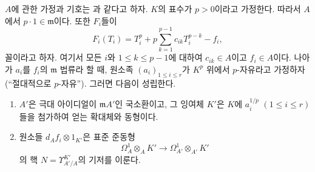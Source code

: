 \begin{proposition}[22.4.4]
\label{0.22.4.4-ko}
$A$에 관한 가정과 기호는 과 같다고 하자. $K$의
표수가 $p>0$이라고 가정한다. 따라서 $A$에서
$p\cdot1\in\mathfrak m$이다. 또한 $F_i$들이
\begin{equation}
\label{0.22.4.4.1-ko}
  F_i(T_i)=T_i^p+p\sum_{k=1}^{p-1}c_{ik}T_i^{p-k}-f_i,
  \tag{22.4.4.1}
\end{equation}
꼴이라고 하자. 여기서 모든 $i$와 $1\leqslant k\leqslant p-1$에
대하여 $c_{ik}\in A$이고 $f_i\in A$이다. 나아가 $a_i$를 $f_i$의
$\mathfrak m$ 법류라 할 때, 원소족
$(a_i)_{1\leqslant i\leqslant r}$가 $K^p$ 위에서 $p$-자유라고
가정하자 (``절대적으로 $p$-자유''). 그러면 다음이 성립한다.
\begin{enumerate}
  \item[(i)] $A'$은 극대 아이디얼이 $\mathfrak mA'$인 국소환이고,
  그 잉여체 $K'$은 $K$에 $a_i^{1/p}$
  $(1\leqslant i\leqslant r)$들을 첨가하여 얻는 확대체와 동형이다.


  \item[(ii)] 원소들 $d_Af_i\otimes1_{K'}$은 표준 준동형
  \[
    \Omega^1_A\otimes_AK'\longrightarrow
    \Omega^1_{A'}\otimes_{A'}K'
  \]
  의 핵 $N=\Upsilon^{K'}_{A'/A}$의 기저를 이룬다.
\end{enumerate}
\end{proposition}

